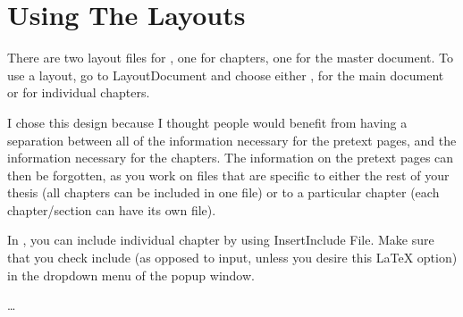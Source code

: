 
\chapter{Using The \LyX{} Layouts}

There are two layout files for \LyX{}, one for chapters, one for the
master document. To use a layout, go to \textsf{Layout\lyxarrow{}Document}
and choose  either , for the main
document or  for individual chapters. 

I chose this design because I thought people would benefit from having
a separation between all of the information necessary for the pretext
pages, and the information necessary for the chapters. The information
on the pretext pages can then be forgotten, as you work on files that
are specific to either the rest of your thesis (all chapters can be
included in one file) or to a particular chapter (each chapter/section
can have its own file).

In \LyX{}, you can include individual chapter by using \textsf{Insert\lyxarrow{}Include
File.} Make sure that you check include (as opposed to input, unless
you desire this \LaTeX{} option) in the dropdown menu of the popup
window.

\ldots{}
